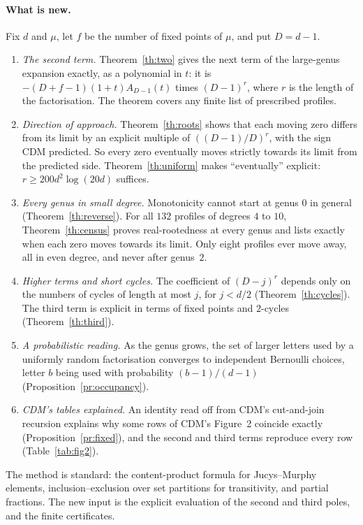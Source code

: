 \documentclass[11pt,a4paper]{article}
\theoremstyle{definition}\newtheorem{definition}[theorem]{Definition}
\theoremstyle{remark}\newtheorem{remark}[theorem]{Remark}\newtheorem{example}[theorem]{Example}
\numberwithin{equation}{section}
\begin{document}
\paragraph{What is new.}
Fix $d$ and $\mu$, let $f$ be the number of fixed points of $\mu$, and put $D=d-1$.
\begin{enumerate}
\item \emph{The second term.} Theorem~\ref{th:two} gives the next term of the large-genus expansion exactly, as a polynomial in $t$: it is $-(D+f-1)(1+t)A_{D-1}(t)$ times $(D-1)^r$, where $r$ is the length of the factorisation. The theorem covers any finite list of prescribed profiles.
\item \emph{Direction of approach.} Theorem~\ref{th:roots} shows that each moving zero differs from its limit by an explicit multiple of $((D-1)/D)^r$, with the sign CDM predicted. So every zero eventually moves strictly towards its limit from the predicted side. Theorem~\ref{th:uniform} makes ``eventually'' explicit: $r\ge200d^2\log(20d)$ suffices.
\item \emph{Every genus in small degree.} Monotonicity cannot start at genus $0$ in general (Theorem~\ref{th:reverse}). For all $132$ profiles of degrees $4$ to $10$, Theorem~\ref{th:census} proves real-rootedness at every genus and lists exactly when each zero moves towards its limit. Only eight profiles ever move away, all in even degree, and never after genus~$2$.
\item \emph{Higher terms and short cycles.} The coefficient of $(D-j)^r$ depends only on the numbers of cycles of length at most $j$, for $j<d/2$ (Theorem~\ref{th:cycles}). The third term is explicit in terms of fixed points and $2$-cycles (Theorem~\ref{th:third}).
\item \emph{A probabilistic reading.} As the genus grows, the set of larger letters used by a uniformly random factorisation converges to independent Bernoulli choices, letter $b$ being used with probability $(b-1)/(d-1)$ (Proposition~\ref{pr:occupancy}).
\item \emph{CDM's tables explained.} An identity read off from CDM's cut-and-join recursion explains why some rows of CDM's Figure~2 coincide exactly (Proposition~\ref{pr:fixed}), and the second and third terms reproduce every row (Table~\ref{tab:fig2}).
\end{enumerate}
The method is standard: the content-product formula for Jucys--Murphy elements, inclusion--exclusion over set partitions for transitivity, and partial fractions. The new input is the explicit evaluation of the second and third poles, and the finite certificates.
\end{document}
